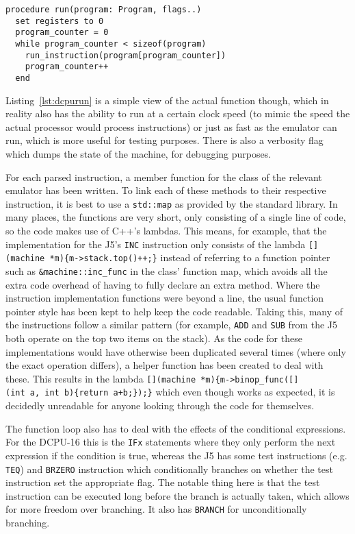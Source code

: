 \noindent\begin{minipage}{\linewidth}
  \begin{lstlisting}[caption={Running a DCPU-16 program},label={lst:dcpurun}]
procedure run(program: Program, flags..)
  set registers to 0
  program_counter = 0
  while program_counter < sizeof(program)
    run_instruction(program[program_counter])
    program_counter++
  end
\end{lstlisting}
\end{minipage}

Listing~\ref{lst:dcpurun} is a simple view of the actual function though, which
in reality also has the ability to run at a certain clock speed (to mimic the
speed the actual processor would process instructions) or just as fast as the
emulator can run, which is more useful for testing purposes. There is also a
verbosity flag which dumps the state of the machine, for debugging purposes.

For each parsed instruction, a member function for the class of the relevant
emulator has been written. To link each of these methods to their respective
instruction, it is best to use a \texttt{std::map} as provided by the standard
library. In many places, the functions are very short, only consisting of a
single line of code, so the code makes use of C++'s lambdas. This means, for
example, that the implementation for the J5's \texttt{INC} instruction only
consists of the lambda \texttt{[](machine~*m)\{m->stack.top()++;\}} instead of
referring to a function pointer such as \lstinline{&machine::inc_func} in the
class' function map, which avoids all the extra code overhead of having to fully
declare an extra method. Where the instruction implementation functions were
beyond a line, the usual function pointer style has been kept to help keep the
code readable. Taking this, many of the instructions follow a similar pattern
(for example, \texttt{ADD} and \texttt{SUB} from the J5 both operate on the top
two items on the stack). As the code for these implementations would have
otherwise been duplicated several times (where only the exact operation
differs), a helper function has been created to deal with these. This results in
the lambda \texttt{[](machine~*m)\{m->binop\_func([](int~a,~int~b)\{return
a+b;\});\}} which even though works as expected, it is decidedly unreadable for
anyone looking through the code for themselves.

The function loop also has to deal with the effects of the conditional
expressions. For the DCPU-16 this is the \texttt{IFx} statements where they only
perform the next expression if the condition is true, whereas the J5 has some
test instructions (e.g. \texttt{TEQ}) and \texttt{BRZERO} instruction which
conditionally branches on whether the test instruction set the appropriate flag.
The notable thing here is that the test instruction can be executed long before
the branch is actually taken, which allows for more freedom over branching. It
also has \texttt{BRANCH} for unconditionally branching.

